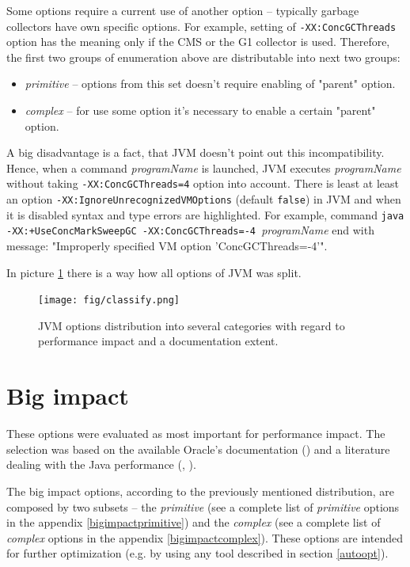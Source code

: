 \documentclass[
  digital, %
  oneside,
  notable, %
  nolof,     %
  nolot     %
]{fithesis3}
\begin{document}
Some options require a current use of another option -- typically garbage collectors have own specific options. For example, setting of \texttt{-XX:ConcGCThreads} option has the meaning only if the CMS or the G1 collector is used. Therefore, the first two groups of enumeration above are distributable into next two groups:
\begin{itemize}
	\item \textit{primitive} -- options from this set doesn't require enabling of "parent" option.
	\item \textit{complex} -- for use some option it's necessary to enable a certain "parent" option.
\end{itemize}
A big disadvantage is a fact, that JVM doesn't point out this incompatibility. Hence, when a command \texttt{} \textit{programName} is launched, JVM executes \textit{programName} without taking \texttt{-XX:ConcGCThreads=4} option into account. There is least at least an option \texttt{-XX:IgnoreUnrecognizedVMOptions} (default \texttt{false}) in JVM and when it is disabled syntax and type errors are highlighted. For example, command \texttt{java -XX:+UseConcMarkSweepGC -XX:ConcGCThreads=-4 }\textit{programName} end with message: "Improperly specified VM option 'ConcGCThreads=-4'".

In picture \ref{classify} there is a way how all options of JVM was split.

\begin{figure}[h]
	\centering
	\texttt{[image: fig/classify.png]}
	\caption{JVM options distribution into several categories with regard to performance impact and a documentation extent.}
	\label{classify}
\end{figure}

\section{Big impact}
These options were evaluated as most important for performance impact. The selection was based on the available Oracle's documentation (\cite{java}) and a literature dealing with the Java performance (\cite{scott}, \cite{hunt}).

The big impact options, according to the previously mentioned distribution, are composed by two subsets -- the \textit{primitive} (see a complete list of \textit{primitive} options in the appendix \ref{bigimpactprimitive}) and the \textit{complex} (see a complete list of \textit{complex} options in the appendix \ref{bigimpactcomplex}). These options are intended for further optimization (e.g. by using any tool described in section \ref{autoopt}).
\end{document}

